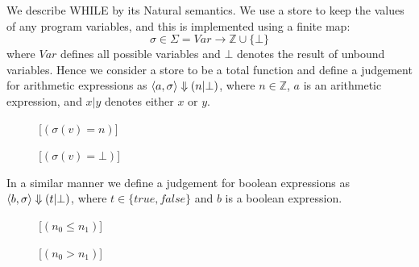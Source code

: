 We describe WHILE by its Natural semantics.
We use a store to keep the values of any program variables, and this is implemented using a finite map:
$$\sigma \in \Sigma = Var \longrightarrow \mathbb{Z} \cup \{\bot\}$$
where $Var$ defines all possible variables and $\bot$ denotes the result of unbound variables.
Hence we consider a store to be a total function and define a judgement for arithmetic expressions as
$\langle a,\sigma \rangle \Downarrow (n | \bot)$, where $n \in \mathbb{Z}$, $a$ is an arithmetic expression, and $x | y$ denotes either $x$ or $y$.

\begin{figure}[h!]
\inference[ACst]{}
{}

\inference[Var]{}
{}[$(\sigma(v) = n)$]

{}[$( \sigma(v) = \bot )$]

{}

{}

{}
\end{figure}

In a similar manner we define a judgement for boolean expressions as $\langle b,\sigma \rangle \Downarrow (t | \bot)$, where $t \in \{true, false\}$ and $b$ is a boolean expression.

\begin{figure}[h!]
\inference[BCst]{}
{}

{}

{}

{}

{}[$(n_0 \leq n_1)$]

{}[$(n_0 > n_1)$]

{}

{}

{}

{}

{}

\end{figure}

